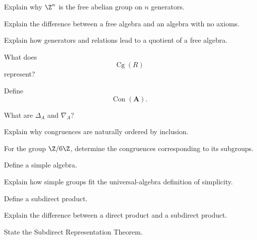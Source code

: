 \begin{exercise}[2]
Explain why \(\Z^n\) is the free abelian group on \(n\) generators.
\end{exercise}

\begin{exercise}[2]
Explain the difference between a free algebra and an algebra with no
axioms.
\end{exercise}

\begin{exercise}[2]
Explain how generators and relations lead to a quotient of a free algebra.
\end{exercise}

\begin{exercise}[1]
What does
\[ \operatorname{Cg}(R) \]
represent?
\end{exercise}

\begin{exercise}[1]
Define
\[ \operatorname{Con}(\mathbf A). \]
\end{exercise}

\begin{exercise}[1]
What are \(\Delta_A\) and \(\nabla_A\)?
\end{exercise}

\begin{exercise}[2]
Explain why congruences are naturally ordered by inclusion.
\end{exercise}

\begin{exercise}[2]
For the group \(\Z/6\Z\), determine the congruences corresponding to its
subgroups.
\end{exercise}

\begin{exercise}[1]
Define a simple algebra.
\end{exercise}

\begin{exercise}[2]
Explain how simple groups fit the universal-algebra definition of
simplicity.
\end{exercise}

\begin{exercise}[1]
Define a subdirect product.
\end{exercise}

\begin{exercise}[2]
Explain the difference between a direct product and a subdirect product.
\end{exercise}

\begin{exercise}[1]
State the Subdirect Representation Theorem.
\end{exercise}

